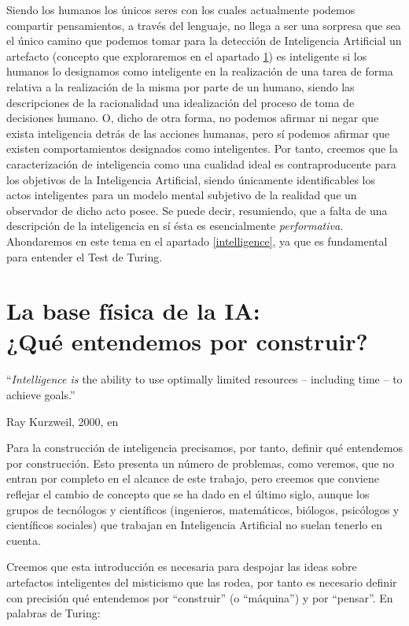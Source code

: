 \documentclass[12pt]{memoir}
\begin{document}
Siendo los humanos los únicos seres con los cuales actualmente podemos compartir pensamientos, a través del lenguaje, no llega a ser una sorpresa que sea el único camino que podemos tomar para la detección de Inteligencia Artificial un artefacto (concepto que exploraremos en el apartado \ref{construct}) es inteligente si los humanos lo designamos como inteligente en la realización de una tarea de forma relativa a la realización de la misma por parte de un humano, siendo las descripciones de la racionalidad una idealización del proceso de toma de decisiones humano. O, dicho de otra forma, no podemos afirmar ni negar que exista inteligencia detrás de las acciones humanas, pero sí podemos afirmar que existen comportamientos designados como inteligentes. Por tanto, creemos que la caracterización de inteligencia como una cualidad ideal es contraproducente para los objetivos de la Inteligencia Artificial, siendo únicamente identificables los actos inteligentes para un modelo mental subjetivo de la realidad que un observador de dicho acto posee. Se puede decir, resumiendo, que a falta de una descripción de la inteligencia en sí ésta es esencialmente \textit{performativa}. Ahondaremos en este tema en el apartado \ref{intelligence}, ya que es fundamental para entender el Test de Turing.

\chapter[La base física de la IA: ¿Qué entendemos por construir?]{La base física de la IA: \\ ¿Qué entendemos por construir?}
\label{construct}
\epigraph{``\textit{Intelligence is} the ability to use optimally limited resources – including time – to achieve goals.''}{Ray Kurzweil, 2000, en \parencite{intDefs}}

Para la construcción de inteligencia precisamos, por tanto, definir qué entendemos por construcción. Esto presenta un número de problemas, como veremos, que no entran por completo en el alcance de este trabajo, pero creemos que conviene reflejar el cambio de concepto que se ha dado en el último siglo, aunque los grupos de tecnólogos y científicos (ingenieros, matemáticos, biólogos, psicólogos y científicos sociales) que trabajan en Inteligencia Artificial no suelan tenerlo en cuenta. 

Creemos que esta introducción es necesaria para despojar las ideas sobre artefactos inteligentes del misticismo que las rodea, por tanto es necesario definir con precisión qué entendemos por ``construir'' (o ``máquina'') y por ``pensar''. En palabras de Turing:
\end{document}
